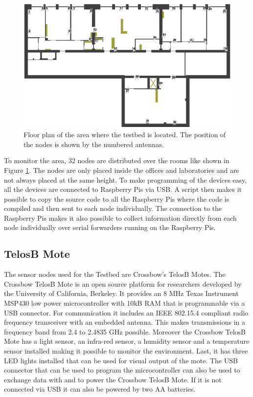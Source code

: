 \begin{figure}[htbp]
	\centering
    \includegraphics[scale=0.75]{content/images/Testbed}
   	\caption{Floor plan of the area where the testbed is located. The position of the nodes is shown by the numbered antennas.}
    \label{fig:testbed}
\end{figure}

To monitor the area, 32 nodes are distributed over the rooms like shown in Figure \ref{fig:testbed}. The nodes are only placed inside the offices and laboratories and are not always placed at the same height. To make programming of the devices easy, all the devices are connected to Raspberry Pis via USB. A script then makes it possible to copy the source code to all the Raspberry Pis where the code is compiled and then sent to each node individually. The connection to the Raspberry Pis makes it also possible to collect information directly from each node individually over serial forwarders running on the Raspberry Pis.

\subsection{TelosB Mote}
\label{chp:TelosB}
The sensor nodes used for the Testbed are Crossbow's TelosB Motes. The Crossbow TelosB Mote is an open source platform for researchers developed by the University of California, Berkeley. It provides an 8 MHz Texas Instrument MSP430 low power microcontroller with 10kB RAM that is programmable via a USB connector. For communication it includes an IEEE 802.15.4 compliant radio frequency transceiver with an embedded antenna. This makes transmissions in a frequency band from 2.4 to 2.4835 GHz possible. Moreover the Crossbow TelosB Mote has a light sensor, an infra-red sensor, a humidity sensor and a temperature sensor installed making it possible to monitor the environment. Last, it has three LED lights installed that can be used for visual output of the mote. The USB connector that can be used to program the microcontroller can also be used to exchange data with and to power the Crossbow TelosB Mote. If it is not connected via USB it can also be powered by two AA batteries. \cite{Telosb}


